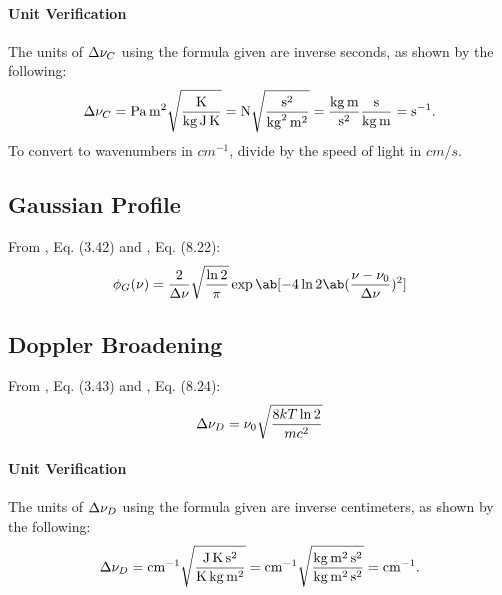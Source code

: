 \documentclass[11pt, twoside, fleqn]{report}
\begin{document}
\paragraph{Unit Verification}

The units of $\adif{\nu}_C$ using the formula given are inverse seconds, as shown by the following:
\begin{equation*}
    \adif{\nu}_C = \unit{Pa.m^2}\sqrt{\frac{\unit{K}}{\unit{kg.J.K}}} = \unit{N}\sqrt{\frac{\unit{s^2}}{\unit{kg^2.m^2}}} = \frac{\unit{kg.m}}{\unit{s^2}}\frac{\unit{s}}{\unit{kg.m}} = \unit{s^{-1}}.
\end{equation*}
To convert to wavenumbers in $\unit{cm^{-1}}$, divide by the speed of light in $\unit{cm/s}$.

\subsection{Gaussian Profile}

From \cite{foxStudentsGuideAtomic2018}, Eq. (3.42) and \cite{hansonSpectroscopyOpticalDiagnostics2016}, Eq. (8.22):
\begin{equation*}
    \phi_G(\nu) = \frac{2}{\adif{\nu}}\sqrt{\frac{\ln{2}}{\pi}}\exp\ab[-4\ln{2}\ab(\frac{\nu - \nu_0}{\adif{\nu}})^2]
\end{equation*}

\subsection{Doppler Broadening}

From \cite{foxStudentsGuideAtomic2018}, Eq. (3.43) and \cite{hansonSpectroscopyOpticalDiagnostics2016}, Eq. (8.24):
\begin{equation*}
    \adif{\nu}_D = \nu_0\sqrt{\frac{8kT\ln{2}}{mc^2}}
\end{equation*}

\paragraph{Unit Verification}

The units of $\adif{\nu}_D$ using the formula given are inverse centimeters, as shown by the following:
\begin{equation*}
    \adif{\nu}_D = \unit{cm^{-1}}\sqrt{\frac{\unit{J.K.s^2}}{\unit{K.kg.m^2}}} = \unit{cm^{-1}}\sqrt{\frac{\unit{kg.m^2.s^2}}{\unit{kg.m^2.s^2}}} = \unit{cm^{-1}}.
\end{equation*}
\end{document}
